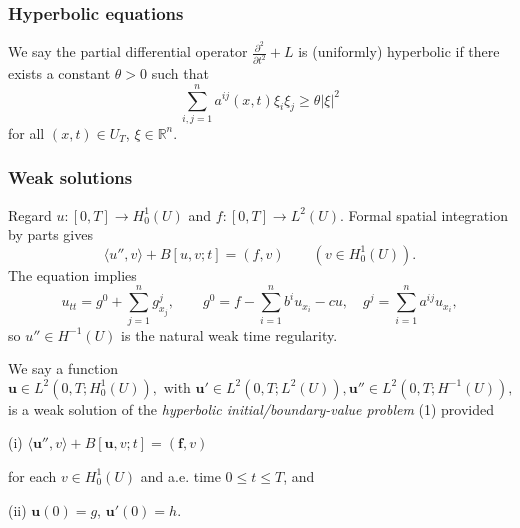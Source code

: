 \subsubsection{Hyperbolic equations}

\begin{definition}
\label{def:uniform-hyperbolicity}
We say the partial differential operator $\frac{\partial^2}{\partial t^2} + L$ is (uniformly) hyperbolic if there exists a constant $\theta > 0$ such that
\[
\sum_{i,j=1}^{n} a^{ij}(x,t)\xi_i\xi_j \geq \theta|\xi|^2
\tag{4}
\]
for all $(x,t) \in U_T$, $\xi \in \mathbb{R}^n$.
\end{definition}

\subsubsection{Weak solutions}

\begin{remark}
\label{rem:motivation-weak-solution-hyperbolic}
Regard $u:[0,T]\to H_0^1(U)$ and $f:[0,T]\to L^2(U)$. Formal spatial integration by parts gives
\[
\langle u'',v\rangle+B[u,v;t]=(f,v) \qquad (v\in H_0^1(U)).
\tag{9}
\]
The equation implies
\[
u_{tt}=g^0+\sum_{j=1}^n g^j_{x_j},\qquad
g^0=f-\sum_{i=1}^n b^iu_{x_i}-cu,\quad
g^j=\sum_{i=1}^n a^{ij}u_{x_i},
\]
so $u''\in H^{-1}(U)$ is the natural weak time regularity.
\end{remark}

\begin{definition}
\label{def:weak-solution-hyperbolic-bvp}
We say a function
\[
\mathbf{u} \in L^2(0, T; H^1_0(U)), \text{ with } \mathbf{u}' \in L^2(0, T; L^2(U)), \mathbf{u}'' \in L^2(0, T; H^{-1}(U)),
\]
is a weak solution of the \textit{hyperbolic initial/boundary-value problem} (1) provided

(i) $\langle \mathbf{u}'', v \rangle + B[\mathbf{u}, v; t] = (\mathbf{f}, v)$

for each $v \in H^1_0(U)$ and a.e. time $0 \le t \le T$, and

(ii) $\mathbf{u}(0) = g$, $\mathbf{u}'(0) = h$.
\end{definition}

